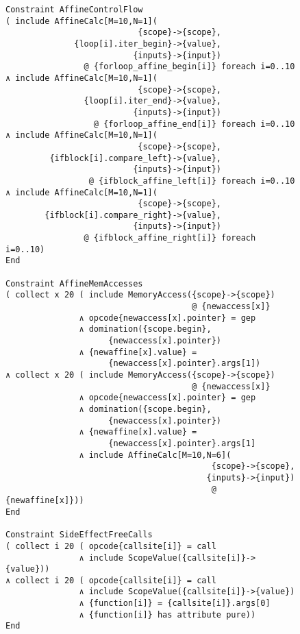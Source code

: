 \begin{figure}[p]
\begin{lstlisting}[language=CAnDL, firstnumber=35]
Constraint AffineControlFlow
( include AffineCalc[M=10,N=1](
                           {scope}->{scope},
              {loop[i].iter_begin}->{value},
                          {inputs}->{input})
                @ {forloop_affine_begin[i]} foreach i=0..10
∧ include AffineCalc[M=10,N=1](
                           {scope}->{scope},
                {loop[i].iter_end}->{value},
                          {inputs}->{input})
                  @ {forloop_affine_end[i]} foreach i=0..10
∧ include AffineCalc[M=10,N=1](
                           {scope}->{scope},
         {ifblock[i].compare_left}->{value},
                          {inputs}->{input})
                 @ {ifblock_affine_left[i]} foreach i=0..10
∧ include AffineCalc[M=10,N=1](
                           {scope}->{scope},
        {ifblock[i].compare_right}->{value},
                          {inputs}->{input})
                @ {ifblock_affine_right[i]} foreach i=0..10)
End

Constraint AffineMemAccesses
( collect x 20 ( include MemoryAccess({scope}->{scope})
                                      @ {newaccess[x]}
               ∧ opcode{newaccess[x].pointer} = gep
               ∧ domination({scope.begin},
                     {newaccess[x].pointer})
               ∧ {newaffine[x].value} =
                     {newaccess[x].pointer}.args[1])
∧ collect x 20 ( include MemoryAccess({scope}->{scope})
                                      @ {newaccess[x]}
               ∧ opcode{newaccess[x].pointer} = gep
               ∧ domination({scope.begin},
                     {newaccess[x].pointer})
               ∧ {newaffine[x].value} =
                     {newaccess[x].pointer}.args[1]
               ∧ include AffineCalc[M=10,N=6](
                                          {scope}->{scope},
                                         {inputs}->{input})
                                          @ {newaffine[x]}))
End

Constraint SideEffectFreeCalls
( collect i 20 ( opcode{callsite[i]} = call
               ∧ include ScopeValue({callsite[i]}->{value}))
∧ collect i 20 ( opcode{callsite[i]} = call
               ∧ include ScopeValue({callsite[i]}->{value})
               ∧ {function[i]} = {callsite[i]}.args[0]
               ∧ {function[i]} has attribute pure))
End
\end{lstlisting}
\end{figure}
